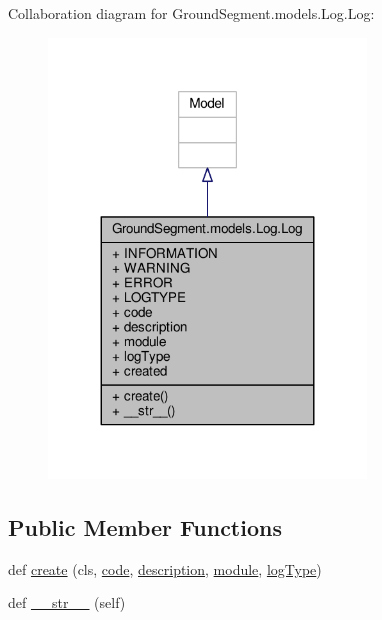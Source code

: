 Collaboration diagram for Ground\+Segment.\+models.\+Log.\+Log\+:\nopagebreak
\begin{figure}[H]
\begin{center}
\leavevmode
\includegraphics[width=239pt]{class_ground_segment_1_1models_1_1_log_1_1_log__coll__graph}
\end{center}
\end{figure}
\subsection*{Public Member Functions}
\begin{DoxyCompactItemize}
\item 
def \hyperlink{class_ground_segment_1_1models_1_1_log_1_1_log_a68eae7e99771c95ea2ba04e8f6492f0a}{create} (cls, \hyperlink{class_ground_segment_1_1models_1_1_log_1_1_log_ae8de250667b9b871ac02617cae717eef}{code}, \hyperlink{class_ground_segment_1_1models_1_1_log_1_1_log_aec39855e51031089ade633107205980c}{description}, \hyperlink{class_ground_segment_1_1models_1_1_log_1_1_log_a641912d76965a5802c808ca609194bf2}{module}, \hyperlink{class_ground_segment_1_1models_1_1_log_1_1_log_a71704dacd9c83ffc71076bb1e05293fd}{log\+Type})
\item 
def \hyperlink{class_ground_segment_1_1models_1_1_log_1_1_log_a2e40a86e6a49bd14738fe7ccb9903347}{\+\_\+\+\_\+str\+\_\+\+\_\+} (self)
\end{DoxyCompactItemize}
